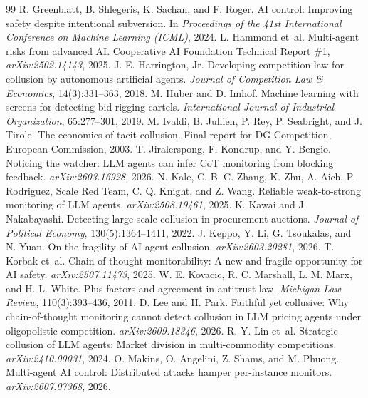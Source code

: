 \documentclass[10pt]{article}
\begin{document}
\begin{thebibliography}{99}
 R. Greenblatt, B. Shlegeris, K. Sachan, and F. Roger. AI control: Improving safety despite intentional subversion. In \emph{Proceedings of the 41st International Conference on Machine Learning (ICML)}, 2024.
 L. Hammond et~al. Multi-agent risks from advanced AI. Cooperative AI Foundation Technical Report \#1, \emph{arXiv:2502.14143}, 2025.
 J. E. Harrington, Jr. Developing competition law for collusion by autonomous artificial agents. \emph{Journal of Competition Law \& Economics}, 14(3):331--363, 2018.
 M. Huber and D. Imhof. Machine learning with screens for detecting bid-rigging cartels. \emph{International Journal of Industrial Organization}, 65:277--301, 2019.
 M. Ivaldi, B. Jullien, P. Rey, P. Seabright, and J. Tirole. The economics of tacit collusion. Final report for DG Competition, European Commission, 2003.
 T. Jiralerspong, F. Kondrup, and Y. Bengio. Noticing the watcher: LLM agents can infer CoT monitoring from blocking feedback. \emph{arXiv:2603.16928}, 2026.
 N. Kale, C. B. C. Zhang, K. Zhu, A. Aich, P. Rodriguez, Scale Red Team, C. Q. Knight, and Z. Wang. Reliable weak-to-strong monitoring of LLM agents. \emph{arXiv:2508.19461}, 2025.
 K. Kawai and J. Nakabayashi. Detecting large-scale collusion in procurement auctions. \emph{Journal of Political Economy}, 130(5):1364--1411, 2022.
 J. Keppo, Y. Li, G. Tsoukalas, and N. Yuan. On the fragility of AI agent collusion. \emph{arXiv:2603.20281}, 2026.
 T. Korbak et~al. Chain of thought monitorability: A new and fragile opportunity for AI safety. \emph{arXiv:2507.11473}, 2025.
 W. E. Kovacic, R. C. Marshall, L. M. Marx, and H. L. White. Plus factors and agreement in antitrust law. \emph{Michigan Law Review}, 110(3):393--436, 2011.
 D. Lee and H. Park. Faithful yet collusive: Why chain-of-thought monitoring cannot detect collusion in LLM pricing agents under oligopolistic competition. \emph{arXiv:2609.18346}, 2026.
 R. Y. Lin et~al. Strategic collusion of LLM agents: Market division in multi-commodity competitions. \emph{arXiv:2410.00031}, 2024.
 O. Makins, O. Angelini, Z. Shams, and M. Phuong. Multi-agent AI control: Distributed attacks hamper per-instance monitors. \emph{arXiv:2607.07368}, 2026.

\end{thebibliography}
\end{document}

